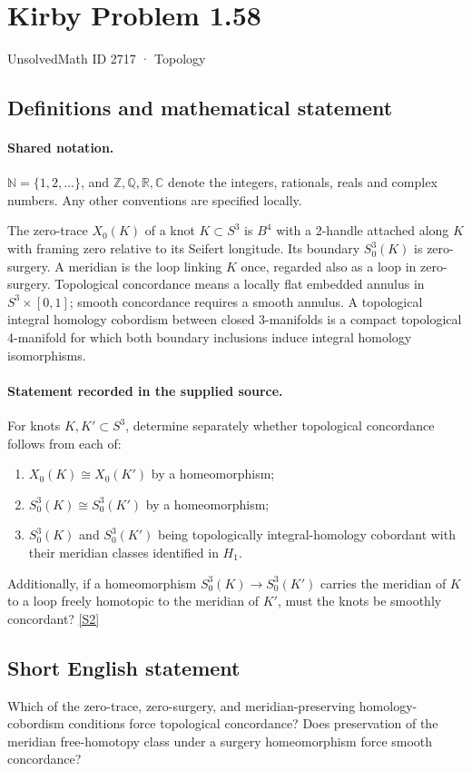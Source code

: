\documentclass[11pt]{article}
\newcommand{\sref}[2]{\hyperlink{source:#1:#2}{[S#2]}}
\begin{document}
\setcounter{section}{2716}
\section{Kirby Problem 1.58}\label{2717}
{\small\sffamily UnsolvedMath ID 2717 · Topology}
\subsection{Definitions and mathematical statement}

\paragraph{Shared notation.}$\mathbb N=\{1,2,\ldots\}$, and $\mathbb Z,\mathbb Q,\mathbb R,\mathbb C$ denote the integers, rationals, reals and complex numbers. Any other conventions are specified locally.


The zero-trace $X_0(K)$ of a knot $K\subset S^3$ is $B^4$ with a 2-handle attached along $K$ with framing zero relative to its Seifert longitude. Its boundary $S^3_0(K)$ is zero-surgery. A meridian is the loop linking $K$ once, regarded also as a loop in zero-surgery. Topological concordance means a locally flat embedded annulus in $S^3\times[0,1]$; smooth concordance requires a smooth annulus. A topological integral homology cobordism between closed 3-manifolds is a compact topological 4-manifold for which both boundary inclusions induce integral homology isomorphisms.
\paragraph{Statement recorded in the supplied source.}
For knots $K,K'\subset S^3$, determine separately whether topological concordance follows from each of:
\begin{enumerate}
\item $X_0(K)\cong X_0(K')$ by a homeomorphism;
\item $S^3_0(K)\cong S^3_0(K')$ by a homeomorphism;
\item $S^3_0(K)$ and $S^3_0(K')$ being topologically integral-homology cobordant with their meridian classes identified in $H_1$.
\end{enumerate}
Additionally, if a homeomorphism $S^3_0(K)\to S^3_0(K')$ carries the meridian of $K$ to a loop freely homotopic to the meridian of $K'$, must the knots be smoothly concordant? \sref{2717}{2}

\subsection{Short English statement}
Which of the zero-trace, zero-surgery, and meridian-preserving homology-cobordism conditions force topological concordance? Does preservation of the meridian free-homotopy class under a surgery homeomorphism force smooth concordance?
\end{document}
